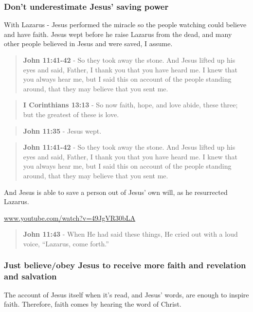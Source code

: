 \documentclass[11pt]{article}
\begin{document}
\subsubsection{Don't underestimate Jesus' saving power}
\label{sec:org481fa68}

With Lazarus - Jesus performed the miracle so the people watching could believe and have faith.
Jesus wept before he raise Lazarus from the dead, and many other people believed in Jesus and were saved, I assume.

\begin{quote}
\textbf{John 11:41-42} - So they took away the stone. And Jesus lifted up his eyes and said, Father, I thank you that you have heard me. I knew that you always hear me, but I said this on account of the people standing around, that they may believe that you sent me.
\end{quote}

\begin{quote}
\textbf{I Corinthians 13:13} - So now faith, hope, and love abide, these three; but the greatest of these is love.
\end{quote}

\begin{quote}
\textbf{John 11:35} - Jesus wept.
\end{quote}

\begin{quote}
\textbf{John 11:41-42} - So they took away the stone. And Jesus lifted up his eyes and said, Father, I thank you that you have heard me. I knew that you always hear me, but I said this on account of the people standing around, that they may believe that you sent me.
\end{quote}

And Jesus is able to save a person out of Jesus' own will, as he resurrected Lazarus.

\href{https://www.youtube.com/watch?v=49JgVR30bLA}{www.youtube.com/watch?v=49JgVR30bLA}

\begin{quote}
\textbf{John 11:43} - When He had said these things, He cried out with a loud voice, “Lazarus, come forth.”
\end{quote}

\subsubsection{Just believe/obey Jesus to receive more faith and revelation and salvation}
\label{sec:orgf5198d2}
The account of Jesus itself when it's read, and Jesus' words, are enough to inspire faith. Therefore, faith comes by hearing the word of Christ.
\end{document}
